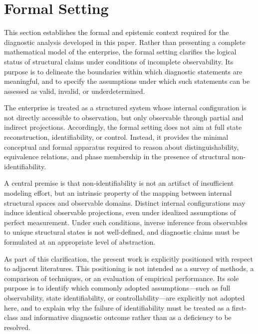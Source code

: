 ﻿\section{Formal Setting}

This section establishes the formal and epistemic context required for the diagnostic analysis developed in this paper.
Rather than presenting a complete mathematical model of the enterprise, the formal setting clarifies the logical status of structural claims under conditions of incomplete observability.
Its purpose is to delineate the boundaries within which diagnostic statements are meaningful, and to specify the assumptions under which such statements can be assessed as valid, invalid, or underdetermined.

The enterprise is treated as a structured system whose internal configuration is not directly accessible to observation, but only observable through partial and indirect projections.
Accordingly, the formal setting does not aim at full state reconstruction, identifiability, or control.
Instead, it provides the minimal conceptual and formal apparatus required to reason about distinguishability, equivalence relations, and phase membership in the presence of structural non-identifiability.

A central premise is that non-identifiability is not an artifact of insufficient modeling effort, but an intrinsic property of the mapping between internal structural spaces and observable domains.
Distinct internal configurations may induce identical observable projections, even under idealized assumptions of perfect measurement.
Under such conditions, inverse inference from observables to unique structural states is not well-defined, and diagnostic claims must be formulated at an appropriate level of abstraction.

As part of this clarification, the present work is explicitly positioned with respect to adjacent literatures.
This positioning is not intended as a survey of methods, a comparison of techniques, or an evaluation of empirical performance.
Its sole purpose is to identify which commonly adopted assumptions—such as full observability, state identifiability, or controllability—are explicitly not adopted here, and to explain why the failure of identifiability must be treated as a first-class and informative diagnostic outcome rather than as a deficiency to be resolved.


